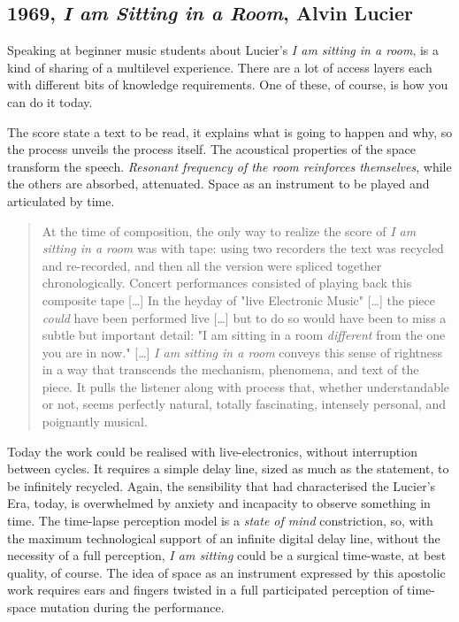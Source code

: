 \documentclass[twoside,a4paper]{article}
\begin{document}

\subsection{1969, \emph{I am Sitting in a Room}, Alvin Lucier}

Speaking at beginner music students about Lucier's \emph{I am sitting in a room}, is a kind of sharing of a multilevel experience. There are a lot of access layers each with different bits of knowledge requirements. One of these, of course, is how you can do it today. 

The score state a text to be read, it explains what is going to happen and why, so the process unveils the process itself. The acoustical properties of the space transform the speech. \emph{Resonant frequency of the room reinforces themselves}, while the others are absorbed, attenuated. Space as an instrument to be played and articulated by time. 

\begin{quote}
At the time of composition, the only way to realize the score of \emph{I am sitting in a room} was with tape: using two recorders the text was recycled and re-recorded, and then all the version were spliced together chronologically. Concert performances consisted of playing back this composite tape [\ldots] In the heyday of "live Electronic Music" [\ldots] the piece \emph{could} have been performed live [\ldots] but to do so would have been to miss a subtle but important detail: "I am sitting in a room \emph{different} from the one you are in now." [\ldots] \emph{I am sitting in a room} conveys this sense of rightness in a way that transcends the mechanism, phenomena, and text of the piece. It pulls the listener along with process that, whether understandable or not, seems perfectly natural, totally fascinating, intensely personal, and poignantly musical. \cite{alCD90} 
\end{quote}

Today the work could be realised with live-electronics, without interruption between cycles. It requires a simple delay line, sized as much as the statement, to be infinitely recycled. Again, the sensibility that had characterised the Lucier's Era, today, is overwhelmed by anxiety and incapacity to observe something in time. The time-lapse perception model is a \emph{state of mind} constriction, so, with the maximum technological support of an infinite digital delay line, without the necessity of a full perception, \emph{I am sitting} could be a surgical time-waste, at best quality, of course. The idea of space as an instrument expressed by this apostolic work requires ears and fingers twisted in a full participated perception of time-space mutation during the performance. 
\end{document}

